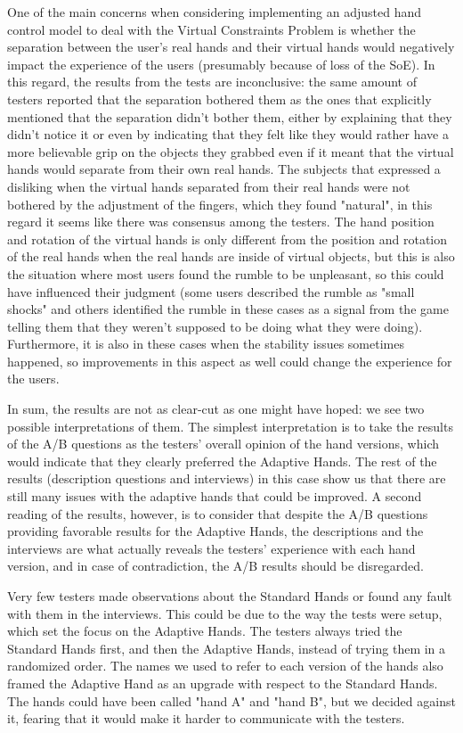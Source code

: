 One of the main concerns when considering implementing an adjusted hand control model to deal with the Virtual Constraints Problem is whether the separation between the user's real hands and their virtual hands would negatively impact the experience of the users (presumably because of loss of the SoE). In this regard, the results from the tests are inconclusive: the same amount of testers reported that the separation bothered them as the ones that explicitly mentioned that the separation didn't bother them, either by explaining that they didn't notice it or even by indicating that they felt like they would rather have a more believable grip on the objects they grabbed even if it meant that the virtual hands would separate from their own real hands. The subjects that expressed a disliking when the virtual hands separated from their real hands were not bothered by the adjustment of the fingers, which they found "natural", in this regard it seems like there was consensus among the testers. The hand position and rotation of the virtual hands is only different from the position and rotation of the real hands when the real hands are inside of virtual objects, but this is also the situation where most users found the rumble to be unpleasant, so this could have influenced their judgment (some users described the rumble as "small shocks" and others identified the rumble in these cases as a signal from the game telling them that they weren't supposed to be doing what they were doing). Furthermore, it is also in these cases when the stability issues sometimes happened, so improvements in this aspect as well could change the experience for the users. 

In sum, the results are not as clear-cut as one might have hoped: we see two possible interpretations of them. The simplest interpretation is to take the results of the A/B questions as the testers' overall opinion of the hand versions, which would indicate that they clearly preferred the Adaptive Hands. The rest of the results (description questions and interviews) in this case show us that there are still many issues with the adaptive hands that could be improved. A second reading of the results, however, is to consider that despite the A/B questions providing favorable results for the Adaptive Hands, the descriptions and the interviews are what actually reveals the testers' experience with each hand version, and in case of contradiction, the A/B results should be disregarded. 

Very few testers made observations about the Standard Hands or found any fault with them in the interviews. This could be due to the way the tests were setup, which set the focus on the Adaptive Hands. The testers always tried the Standard Hands first, and then the Adaptive Hands, instead of trying them in a randomized order. The names we used to refer to each version of the hands also framed the Adaptive Hand as an upgrade with respect to the Standard Hands. The hands could have been called "hand A" and "hand B", but we decided against it, fearing that it would make it harder to communicate with the testers.

